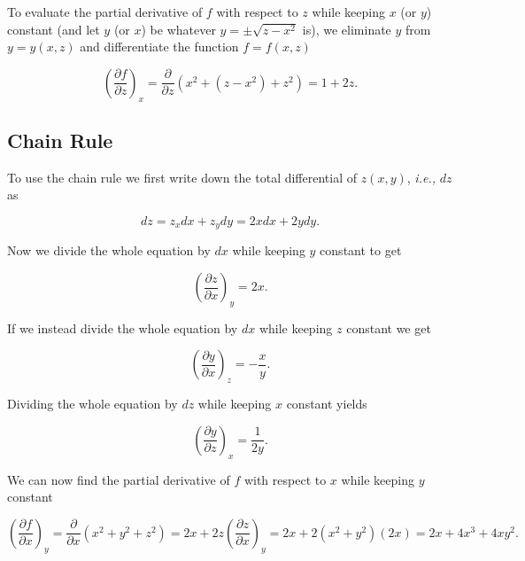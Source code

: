 \documentclass[english,a4paper,12pt]{report}
\begin{document}
To evaluate the partial derivative of \(f\) with respect to \(z\) while keeping \(x\) (or \(y\)) constant (and let \(y\) (or \(x\)) be whatever \(y = \pm \sqrt{z-x^2} \) is), we eliminate \(y\) from \(y = y(x,z)\) and differentiate the function \(f = f(x,z)\)

\begin{equation}
	\left( \frac{\partial f}{\partial z} \right)_{x} = \frac{\partial }{\partial z} (x^2+(z-x^2)+z^2) = 1+2z. 
\end{equation}

\subsection{Chain Rule}

To use the chain rule we first write down the total differential of \(z(x,y)\), \textit{i.e.,} \(dz\) as

\begin{equation}
	dz = z_{x} dx + z_{y} dy = 2x dx + 2ydy.   
\end{equation}

Now we divide the whole equation by \(dx\) while keeping \(y\) constant to get 

\begin{equation}
	\left( \frac{\partial z}{\partial x} \right)_{y} = 2x.
\end{equation}

If we instead divide the whole equation by \(dx\) while keeping \(z\) constant we get

\begin{equation}
	\left( \frac{\partial y}{\partial x} \right)_{z} = -\frac{x}{y}.  
\end{equation}

Dividing the whole equation by \(dz\) while keeping \(x\) constant yields

\begin{equation}
	\left( \frac{\partial y}{\partial z} \right)_{x} = \frac{1}{2y}.
\end{equation}




We can now find the partial derivative of \(f\) with respect to \(x\) while keeping \(y\) constant

\begin{equation}
	\left( \frac{\partial f}{\partial x} \right)_{y} = \frac{\partial }{\partial x}  (x^2+y^2+z^2) = 2x + 2z \left( \frac{\partial z}{\partial x} \right)_{y} = 2x + 2(x^2+y^2) (2x) = 2x + 4x^3 + 4xy^2.
\end{equation}
\end{document}
